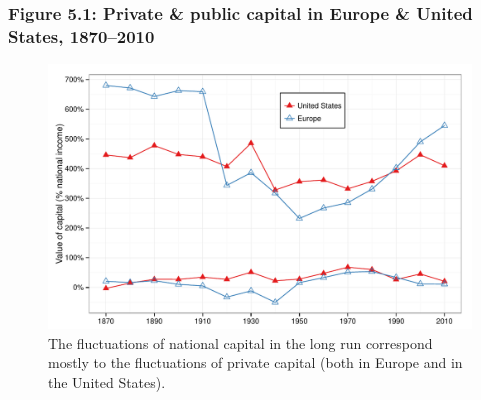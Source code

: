 \documentclass[t]{beamer}\usepackage[]{graphicx}\usepackage[]{color}
\newenvironment{knitrout}{}{} %
\begin{document}
\begin{frame}[label=Figure_5_1]
\frametitle{Figure 5.1: Private \& public capital in Europe \& United States, 1870--2010}
\begin{figure}[t]
\begin{minipage}[b]{\textwidth}
\centering
\begin{knitrout}\footnotesize
{}\color{fgcolor}

{\centering \includegraphics[width=1\linewidth]{figures/color/Figure_5_1} 

}



\end{knitrout}
\caption{The fluctuations of national capital in the long run correspond mostly to the fluctuations of private capital (both in Europe and in the United States).}
\end{minipage}
\end{figure}
\end{frame}
\end{document}
